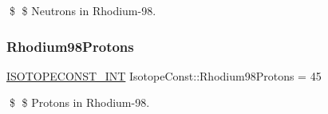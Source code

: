 \$ \$ Neutrons in Rhodium-\/98. \mbox{\label{group___isotope_const-_rhodium-_rh98_gaf8062dd7b2bdd2b78e498228dd5875ca}} 
\subsubsection{\texorpdfstring{Rhodium98\+Protons}{Rhodium98Protons}}
{\footnotesize\ttfamily \mbox{\hyperlink{group___isotope_const-_macros_ga5f18360b3e99483a35c32d789e62621c}{I\+S\+O\+T\+O\+P\+E\+C\+O\+N\+S\+T\+\_\+\+I\+NT}} Isotope\+Const\+::\+Rhodium98\+Protons = 45}

\$ \$ Protons in Rhodium-\/98. 